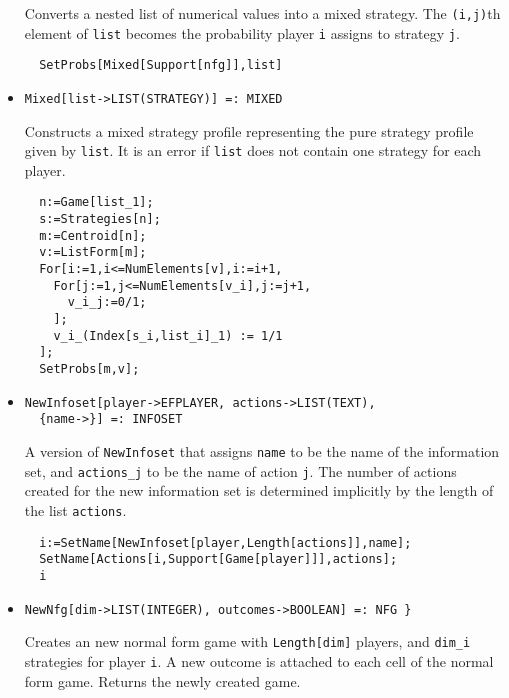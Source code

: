 \begin{itemize}
\bd 
Converts a nested list of numerical values into a mixed strategy.  The
\verb+(i,j)+th element of \verb+list+ becomes the probability
player \verb+i+ assigns to strategy \verb+j+. 
\begin{verbatim}
  SetProbs[Mixed[Support[nfg]],list]
\end{verbatim} 
\ed

\item{}
\protect \large \begin{verbatim}
Mixed[list->LIST(STRATEGY)] =: MIXED 
\end{verbatim}\normalsize

\bd 
Constructs a mixed strategy profile representing the pure strategy
profile given by \verb+list+. It is an error if \verb+list+ does not
contain one strategy for each player.
\begin{verbatim}
  n:=Game[list_1];
  s:=Strategies[n];
  m:=Centroid[n];
  v:=ListForm[m];
  For[i:=1,i<=NumElements[v],i:=i+1,
    For[j:=1,j<=NumElements[v_i],j:=j+1,
      v_i_j:=0/1;
    ];
    v_i_(Index[s_i,list_i]_1) := 1/1
  ];
  SetProbs[m,v];   
\end{verbatim} 
\ed



\item{}
\protect \large \begin{verbatim}
NewInfoset[player->EFPLAYER, actions->LIST(TEXT), 
  {name->}] =: INFOSET 
\end{verbatim}\normalsize

\bd 
A version of \verb+NewInfoset+ that assigns \verb+name+ to be the name
of the information set, and \verb+actions_j+ to be the name of action
\verb+j+.  The number of actions created for the new information set
is determined implicitly by the length of the list \verb+actions+.  
\begin{verbatim}
  i:=SetName[NewInfoset[player,Length[actions]],name];
  SetName[Actions[i,Support[Game[player]]],actions];
  i
\end{verbatim} 
\ed

\item{}
\protect \large \begin{verbatim}
NewNfg[dim->LIST(INTEGER), outcomes->BOOLEAN] =: NFG }
\end{verbatim}\normalsize

\bd 

Creates an new normal form game with \verb+Length[dim]+ players, and
\verb+dim_i+ strategies for player \verb+i+.  A new outcome is
attached to each cell of the normal form game.  Returns the newly
created game.


\end{itemize}
